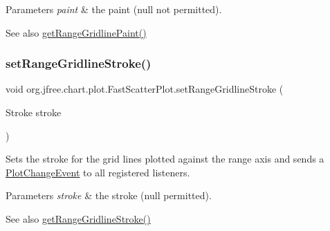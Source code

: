 \begin{DoxyParams}{Parameters}
{\em paint} & the paint ({\ttfamily null} not permitted).\\
\hline
\end{DoxyParams}
\begin{DoxySeeAlso}{See also}
\mbox{\hyperlink{classorg_1_1jfree_1_1chart_1_1plot_1_1_fast_scatter_plot_afb960031ca8207656dcbd895221a3ed1}{get\+Range\+Gridline\+Paint()}} 
\end{DoxySeeAlso}
\mbox{\label{classorg_1_1jfree_1_1chart_1_1plot_1_1_fast_scatter_plot_ac3387d82602cc9d59ecf2407b624045f}} 
\subsubsection{\texorpdfstring{set\+Range\+Gridline\+Stroke()}{setRangeGridlineStroke()}}
{\footnotesize\ttfamily void org.\+jfree.\+chart.\+plot.\+Fast\+Scatter\+Plot.\+set\+Range\+Gridline\+Stroke (\begin{DoxyParamCaption}\item[{Stroke}]{stroke }\end{DoxyParamCaption})}

Sets the stroke for the grid lines plotted against the range axis and sends a \mbox{\hyperlink{}{Plot\+Change\+Event}} to all registered listeners.


\begin{DoxyParams}{Parameters}
{\em stroke} & the stroke ({\ttfamily null} permitted).\\
\hline
\end{DoxyParams}
\begin{DoxySeeAlso}{See also}
\mbox{\hyperlink{classorg_1_1jfree_1_1chart_1_1plot_1_1_fast_scatter_plot_a4c4cc7c68b1bf7c7396d3d7cd8aff979}{get\+Range\+Gridline\+Stroke()}} 
\end{DoxySeeAlso}
\mbox{\label{classorg_1_1jfree_1_1chart_1_1plot_1_1_fast_scatter_plot_a4c138745182ea476a64eacb632b5af6c}} 

